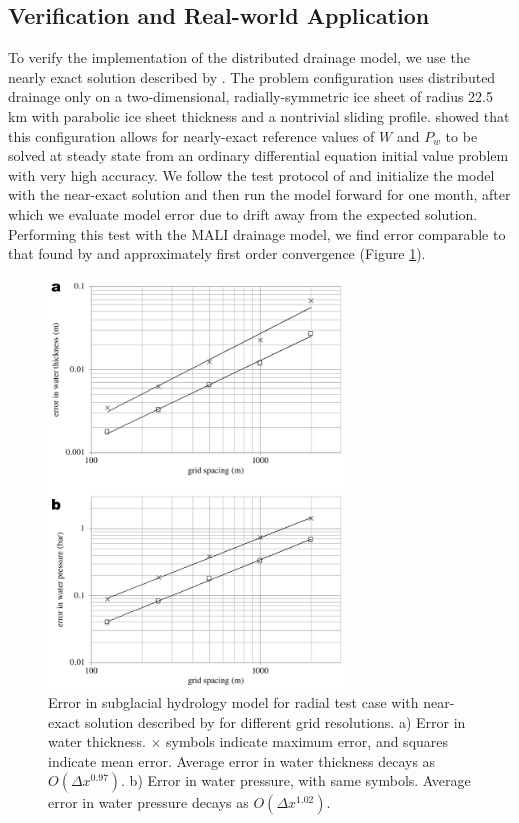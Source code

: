 \subsection{Verification and Real-world Application}

To verify the implementation of the distributed drainage model, we use the nearly exact solution described by \citet{Bueler2015}.
The problem configuration uses distributed drainage only on a two-dimensional, radially-symmetric ice sheet of radius 22.5 km with parabolic ice sheet thickness and a nontrivial sliding profile.  
\citet{Bueler2015} showed that this configuration allows for nearly-exact reference values of $W$ and $P_w$
to be solved at steady state from an ordinary differential equation initial value problem with very high accuracy.
We follow the test protocol of \citet{Bueler2015} and initialize the model
with the near-exact solution and then run the model forward for one month,
after which we evaluate model error due to drift away from the expected solution.
Performing this test with the MALI drainage model, 
we find error comparable to that found by \citet{Bueler2015} and 
approximately first order convergence (Figure \ref{fig:sgh:radialsolnfig}).

\begin{figure}[t]
\includegraphics[width=8.0cm]{landice/figures/hydro_convergence_plots_clean.pdf}
\caption{
Error in subglacial hydrology model for radial test case with near-exact solution
described by \citet{Bueler2015} for different grid resolutions.
a) Error in water thickness.  $\times$ symbols indicate maximum error, and squares indicate mean error.
Average error in water thickness decays as $O(\Delta x^{0.97})$.
b) Error in water pressure, with same symbols.
Average error in water pressure  decays as $O(\Delta x^{1.02})$.
}
\label{fig:sgh:radialsolnfig}
\end{figure}

